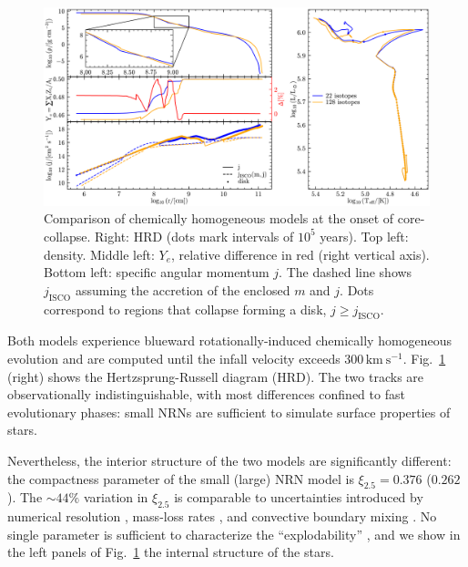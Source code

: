 \documentclass[twocolumn]{aastex63}
\DeclareRobustCommand{\Figref}[1]{Fig.~\ref{#1}}
\begin{document}
\begin{figure}[htbp]
  \centering
  \includegraphics[width=\textwidth]{comparison}
  \caption{Comparison of chemically homogeneous models at the onset of
    core-collapse. Right: HRD (dots mark intervals of $10^5$ years).
    Top left: density. Middle left: $Y_e$, relative difference in red
    (right vertical axis). Bottom left: specific angular momentum $j$.
    The dashed line shows $j_\mathrm{ISCO}$ assuming the
    accretion of the enclosed $m$ and $j$. Dots correspond to regions
    that collapse forming a disk, $j\geq j_\mathrm{ISCO}$.}
  \label{fig:comparison}
\end{figure}

Both models experience blueward rotationally-induced chemically
homogeneous evolution \citep[e.g.,][]{maeder:00} and are computed
until the infall velocity exceeds $300\,\mathrm{km\
  s^{-1}}$. %
\Figref{fig:comparison} (right) shows the Hertzsprung-Russell diagram
(HRD). The two tracks are observationally indistinguishable, with most
differences confined to fast evolutionary phases: small NRNs are
sufficient to simulate surface properties of
stars. %

Nevertheless, the interior structure of the two models are
significantly different: %
the compactness parameter \citep{oconnor:11} of the small (large) NRN
model is $\xi_{2.5}=0.376$ ($0.262$). The $\sim{}44\%$ variation in
$\xi_{2.5}$ is comparable to uncertainties introduced by numerical
resolution \citep{farmer:16}, mass-loss rates \citep{renzo:17}, and
convective boundary mixing \citep{davis:19}. No single parameter is
sufficient to characterize the ``explodability''
\citep[e.g.,][]{ertl:16, vartanyan:21}, and we show in the left panels
of \Figref{fig:comparison} the internal structure of the
stars. %
\end{document}
